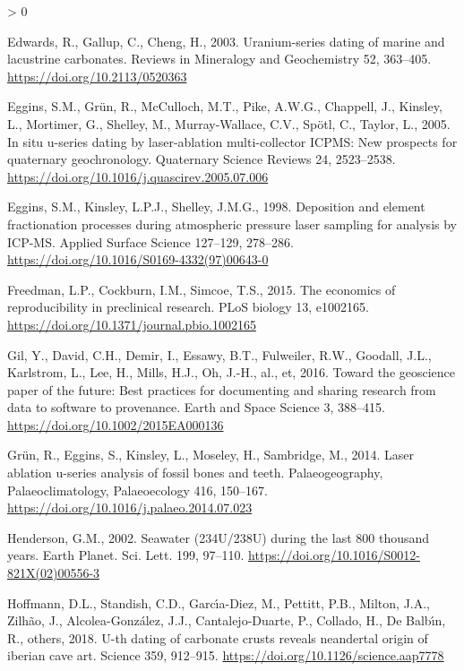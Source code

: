\documentclass[]{elsarticle} %
\newlength{\cslhangindent}
\newenvironment{CSLReferences}[2] %
 {%
  \setlength{\parindent}{0pt}
  \ifodd #1 \everypar{\setlength{\hangindent}{\cslhangindent}}\ignorespaces\fi
  \ifnum #2 > 0
  \setlength{\parskip}{#2\baselineskip}
  \fi
 }%
 {}
\begin{document}
\begin{CSLReferences}{1}{0}
\leavevmode\hypertarget{ref-RN4495}{}%
Edwards, R., Gallup, C., Cheng, H., 2003. Uranium-series dating of marine and lacustrine carbonates. Reviews in Mineralogy and Geochemistry 52, 363--405. \url{https://doi.org/10.2113/0520363}

\leavevmode\hypertarget{ref-Eggins2005}{}%
Eggins, S.M., Grün, R., McCulloch, M.T., Pike, A.W.G., Chappell, J., Kinsley, L., Mortimer, G., Shelley, M., Murray-Wallace, C.V., Spötl, C., Taylor, L., 2005. In situ u-series dating by laser-ablation multi-collector ICPMS: New prospects for quaternary geochronology. Quaternary Science Reviews 24, 2523--2538. \url{https://doi.org/10.1016/j.quascirev.2005.07.006}

\leavevmode\hypertarget{ref-RN2257}{}%
Eggins, S.M., Kinsley, L.P.J., Shelley, J.M.G., 1998. Deposition and element fractionation processes during atmospheric pressure laser sampling for analysis by ICP-MS. Applied Surface Science 127--129, 278--286. \url{https://doi.org/10.1016/S0169-4332(97)00643-0}

\leavevmode\hypertarget{ref-freedman2015economics}{}%
Freedman, L.P., Cockburn, I.M., Simcoe, T.S., 2015. The economics of reproducibility in preclinical research. PLoS biology 13, e1002165. \url{https://doi.org/10.1371/journal.pbio.1002165}

\leavevmode\hypertarget{ref-Gil_et_al_2016}{}%
Gil, Y., David, C.H., Demir, I., Essawy, B.T., Fulweiler, R.W., Goodall, J.L., Karlstrom, L., Lee, H., Mills, H.J., Oh, J.-H., al., et, 2016. Toward the geoscience paper of the future: Best practices for documenting and sharing research from data to software to provenance. Earth and Space Science 3, 388--415. \url{https://doi.org/10.1002/2015EA000136}

\leavevmode\hypertarget{ref-Gruen2014}{}%
Grün, R., Eggins, S., Kinsley, L., Moseley, H., Sambridge, M., 2014. Laser ablation u-series analysis of fossil bones and teeth. Palaeogeography, Palaeoclimatology, Palaeoecology 416, 150--167. \url{https://doi.org/10.1016/j.palaeo.2014.07.023}

\leavevmode\hypertarget{ref-RN35}{}%
Henderson, G.M., 2002. Seawater (234U/238U) during the last 800 thousand years. Earth Planet. Sci. Lett. 199, 97--110. \url{https://doi.org/10.1016/S0012-821X(02)00556-3}

\leavevmode\hypertarget{ref-hoffmann2018u}{}%
Hoffmann, D.L., Standish, C.D., Garcı́a-Diez, M., Pettitt, P.B., Milton, J.A., Zilhão, J., Alcolea-González, J.J., Cantalejo-Duarte, P., Collado, H., De Balbı́n, R., others, 2018. U-th dating of carbonate crusts reveals neandertal origin of iberian cave art. Science 359, 912--915. \url{https://doi.org/10.1126/science.aap7778}


\end{CSLReferences}
\end{document}
